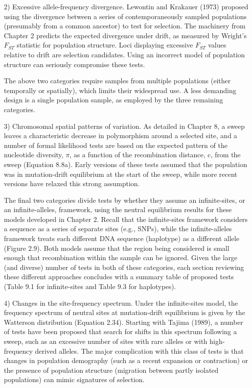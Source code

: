 \documentclass{article}
\begin{document}
2) Excessive allele-frequency divergence. Lewontin and Krakauer (1973) proposed using the divergence between a series of contemporaneously sampled populations (presumably from a common ancestor) to test for selection. The machinery from Chapter 2 predicts the expected divergence under drift, as measured by Wright's  $ F_{ST} $ statistic for population structure. Loci displaying excessive  $ F_{ST} $ values relative to drift are selection candidates. Using an incorrect model of population structure can seriously compromise these tests.

The above two categories require samples from multiple populations (either temporally or spatially), which limits their widespread use. A less demanding design is a single population sample, as employed by the three remaining categories.

3) Chromosomal spatial patterns of variation. As detailed in Chapter 8, a sweep leaves a characteristic decrease in polymorphism around a selected site, and a number of formal likelihood tests are based on the expected pattern of the nucleotide diversity,  $ \pi $, as a function of the recombination distance, c, from the sweep (Equation 8.8a). Early versions of these tests assumed that the population was in mutation-drift equilibrium at the start of the sweep, while more recent versions have relaxed this strong assumption.

The final two categories divide tests by whether they assume an infinite-sites, or an infinite-alleles, framework, using the neutral equilibrium results for these models developed in Chapter 2. Recall that the infinite-sites framework considers a sequence as a series of separate sites (e.g., SNPs), while the infinite-alleles framework treats each different DNA sequence (haplotype) as a different allele (Figure 2.9). Both models assume that the region being considered is small enough that recombination within the sample can be ignored. Given the large (and diverse) number of tests in both of these categories, each section reviewing these different approaches concludes with a summary table of proposed tests (Table 9.1 for infinite-sites and Table 9.3 for haplotypes).

4) Changes in the site-frequency spectrum. Under the infinite-sites model, the frequency spectrum of neutral sites at mutation-drift equilibrium is given by the Watterson distribution (Equation 2.34). Starting with Tajima (1989), a number of tests have been proposed that search for shifts in this spectrum following a sweep, such as an excessive number of sites with rare alleles or with high-frequency derived alleles. The major complication with this class of tests is that changes in population demography (such as a recent expansion or contraction) or the presence of population structure (migration between partly isolated populations) can mimic signatures of selection.
\end{document}
